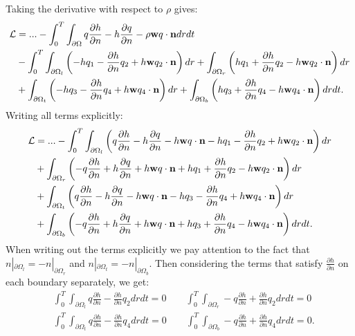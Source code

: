 	Taking the derivative with respect to $\rho$ gives:
	\begin{align*}
		\mathcal{L} &= ... - \int_0^T \int_{\partial \Omega} q \frac{\partial h}{\partial n} - h\frac{\partial q}{\partial n} - \rho \mathbf{w} q  \cdot \mathbf{n}  dr dt\\
		&- \int_0^T \int_{\partial \Omega_l} \left(- h q_1  - \frac{\partial h }{\partial n} q_2 + h \mathbf{w} q_2  \cdot \mathbf{n} \right) dr  + \int_{\partial \Omega_r} \left(h q_1 + \frac{\partial h }{\partial n}q_2 - h \mathbf{w} q_2 \cdot \mathbf{n}  \right) dr  \\
		& + \int_{\partial \Omega_t} \left(- h q_3 - \frac{\partial h }{\partial n} q_4 + h \mathbf{w} q_4 \cdot \mathbf{n}  \right) dr  + \int_{\partial \Omega_b} \left(h q_3 + \frac{\partial h}{\partial n}q_4 - h \mathbf{w} q_4 \cdot \mathbf{n}  \right) drdt.
	\end{align*}
	Writing all terms explicitly:
	\begin{align*}
		\mathcal{L} &= ... - \int_0^T \int_{\partial \Omega_l} \left( q \frac{\partial h}{\partial n} - h\frac{\partial q}{\partial n} - h \mathbf{w} q \cdot \mathbf{n}- h q_1 - \frac{\partial h }{\partial n} q_2 + h \mathbf{w} q_2 \cdot \mathbf{n} \right) dr\\
		&  + \int_{\partial \Omega_r} \left(- q \frac{\partial h}{\partial n} + h\frac{\partial q}{\partial n} + h \mathbf{w} q  \cdot \mathbf{n} + h q_1 + \frac{\partial h }{\partial n}q_2 - h \mathbf{w} q_2 \cdot \mathbf{n} \right) dr  \\
		& + \int_{\partial \Omega_t} \left(q \frac{\partial h}{\partial n} - h\frac{\partial q}{\partial n} - h \mathbf{w} q  \cdot \mathbf{n}- h q_3 - \frac{\partial h }{\partial n} q_4 + h \mathbf{w} q_4 \cdot \mathbf{n} \right) dr\\
		&  + \int_{\partial \Omega_b} \left(-q \frac{\partial h}{\partial n} + h\frac{\partial q}{\partial n} + h \mathbf{w} q  \cdot \mathbf{n} + h q_3 + \frac{\partial h}{\partial n}q_4 - h \mathbf{w} q_4  \cdot \mathbf{n}\right) drdt.
	\end{align*}
	When writing out the terms explicitly we pay attention to the fact that $n|_{\partial \Omega_l} = - n|_{\partial \Omega_r}$ and $n|_{\partial \Omega_t} = - n|_{\partial \Omega_b}$.
	Then considering the terms that satisfy $\frac{\partial h}{\partial n}$ on each boundary separately, we get:
	\begin{align*}
		&\int_0^T \int_{\partial \Omega_l} q \frac{\partial h}{\partial n}- \frac{\partial h }{\partial n} q_2 dr dt= 0 \qquad \int_0^T \int_{\partial \Omega_r} -q \frac{\partial h}{\partial n}+ \frac{\partial h }{\partial n}q_2 dr dt= 0 \\
		&\int_0^T \int_{\partial \Omega_t} q \frac{\partial h}{\partial n}- \frac{\partial h }{\partial n} q_4 dr dt= 0 \qquad \int_0^T \int_{\partial \Omega_b} -q \frac{\partial h}{\partial n}+ \frac{\partial h}{\partial n}q_4 dr dt= 0. \\
	\end{align*}
